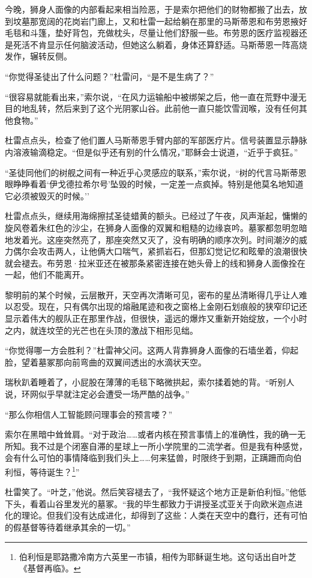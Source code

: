\documentclass[AutoFakeBold=true]{book}
\begin{document}
今晚，狮身人面像的内部看起来相当险恶，于是索尔把他们的财物都搬了出去，放到坟墓那宽阔的花岗岩门廊上，又和杜雷一起给躺在那里的马斯蒂恩和布劳恩掖好毛毯和斗篷，垫好背包，充做枕头，尽量让他们舒服一些。布劳恩的医疗监视器还是死活不肯显示任何脑波活动，但她这么躺着，身体还算舒适。马斯蒂恩一阵高烧发作，辗转反侧。

``你觉得圣徒出了什么问题？''杜雷问，``是不是生病了？''

``很容易就能看出来，''索尔说，``在风力运输船中被绑架之后，他一直在荒野中漫无目的地乱转，然后来到了这个光阴冢山谷。此前他一直只能饮雪润喉，没有任何其他食物。''

杜雷点点头，检查了他们置人马斯蒂恩手臂内部的军部医疗片。信号装置显示静脉内溶液输滴稳定。``但是似乎还有别的什么情况，''耶稣会士说道，``近乎于疯狂。''

``圣徒同他们的树舰之间有一种近乎心灵感应的联系，''索尔说，``树的代言马斯蒂恩眼睁睁看着`伊戈德拉希尔号'坠毁的时候，一定差一点疯掉。特别是他莫名地知道它必须被毁灭的时候。''

杜雷点点头，继续用海绵擦拭圣徒蜡黄的额头。已经过了午夜，风声渐起，慵懒的旋风卷着朱红色的沙尘，在狮身人面像的双翼和粗糙的边缘哀吟。墓冢都忽明忽暗地发着光。这座突然亮了，那座突然又灭了，没有明确的顺序次列。时间潮汐的威力偶尔会攻击两人，让他俩大口喘气，紧抓岩石，但那{\kaishu 幻觉记忆}和眩晕的浪潮很快就会褪去。布劳恩·拉米亚还在被那条紧密连接在她头骨上的线和狮身人面像拴在一起，他们不能离开。

黎明前的某个时候，云层散开，天空再次清晰可见，密布的星丛清晰得几乎让人难以忍受。现在，只有偶尔出现的熔融尾迹和夜之窗格上金刚石划痕般的狭窄印记还显示着伟大的舰队正在那里作战，但很快，遥远的爆炸又重新开始绽放，一个小时之内，就连坟茔的光芒也在头顶的激战下相形见绌。

``你觉得哪一方会胜利？''杜雷神父问。这两人背靠狮身人面像的石墙坐着，仰起脸，望着墓冢那向前弯曲的双翼间透出的水滴状天空。

瑞秋趴着睡着了，小屁股在薄薄的毛毯下略微拱起，索尔揉着她的背。``听别人说，环网似乎早就注定必会遭受一场严酷的战争。''

``那么你相信人工智能顾问理事会的预言喽？''

索尔在黑暗中耸耸肩。``对于政治……或者内核在预言事情上的准确性，我的确一无所知。我不过是个闭塞自滞的星球上一所小学院里的二流学者。但是我有种{\kaishu 感觉}，会有什么可怕的事情降临到我们头上……何来猛兽，时限终于到期，正蹒跚而向伯利恒，等待诞生？\footnote{伯利恒是耶路撒冷南方六英里一市镇，相传为耶稣诞生地。这句话出自叶芝《基督再临》。}''

杜雷笑了。``叶芝，''他说。然后笑容褪去了，``我怀疑这个地方正是新伯利恒。''他低下头，看着山谷里发光的墓冢。``我的毕生都致力于讲授圣忒亚关于向欧米迦点进化的理论。但我们没有达成进化，却得到了这些：人类在天空中的蠢行，还有可怕的假基督等待着继承其余的一切。''
\end{document}
